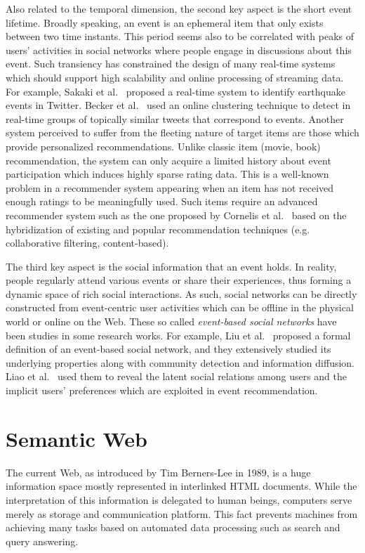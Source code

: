 Also related to the temporal dimension, the second key aspect is the short event lifetime. Broadly speaking, an event is an ephemeral item that only exists between two time instants. This period seems also to be correlated with peaks of users' activities in social networks where people engage in discussions about this event. Such transiency has constrained the design of many real-time systems which should support high scalability and online processing of streaming data. For example, Sakaki et al.~\cite{Sakaki:WWW10} proposed a real-time system to identify earthquake events in Twitter. Becker et al.~\cite{Becker:ICWSM11} used an online clustering technique to detect in real-time groups of topically similar tweets that correspond to events. Another system perceived to suffer from the fleeting nature of target items are those which provide personalized recommendations. Unlike classic item (movie, book) recommendation, the system can only acquire a limited history about event participation which induces highly sparse rating data. This is a well-known problem in a recommender system appearing when an item has not received enough ratings to be meaningfully used. Such items require an advanced recommender system such as the one proposed by Cornelis et al.~\cite{Cornelis:IICAI05} based on the hybridization of existing and popular recommendation techniques (e.g. collaborative filtering, content-based).

The third key aspect is the social information that an event holds. In reality, people regularly attend various events or share their experiences, thus forming a dynamic space of rich social interactions. As such, social networks can be directly constructed from event-centric user activities which can be offline in the physical world or online on the Web. These so called \textit{event-based social networks} have been studies in some research works. For example, Liu et al.~\cite{Liu:2011} proposed a formal definition of an event-based social network, and they extensively studied its underlying properties along with community detection and information diffusion. Liao et al.~\cite{Liao:CIKM13} used them to reveal the latent social relations among users and the implicit users' preferences which are exploited in event recommendation.

\section{Semantic Web}       \label{sec:sematic-web}
The current Web, as introduced by Tim Berners-Lee in 1989, is a huge information space mostly represented in interlinked HTML documents. While the interpretation of this information is delegated to human beings, computers serve merely as storage and communication platform. This fact prevents machines from achieving many tasks based on automated data processing such as search and query answering. 

